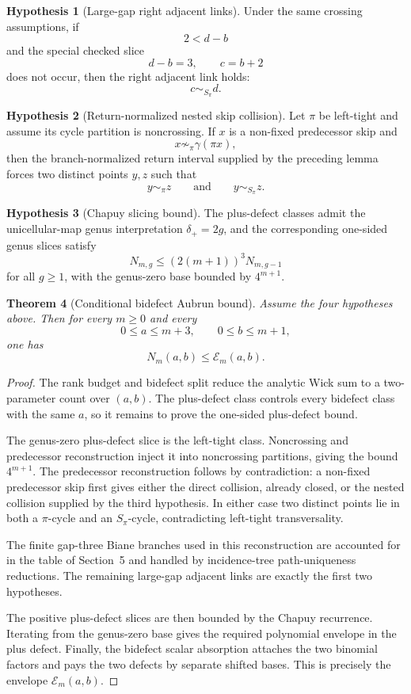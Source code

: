 \documentclass[11pt]{article}
\theoremstyle{plain}
\newtheorem{theorem}{Theorem}[section]
\theoremstyle{definition}
\newtheorem{hypothesis}[theorem]{Hypothesis}
\theoremstyle{remark}
\newcommand{\g}{\gamma}
\newcommand{\p}{\pi}
\newcommand{\defp}{\delta_{+}}
\newcommand{\Env}{\mathcal E}
\begin{document}
\begin{hypothesis}[Large-gap right adjacent links]
Under the same crossing assumptions, if
\[
  2<d-b
\]
and the special checked slice
\[
  d-b=3,\qquad c=b+2
\]
does not occur, then the right adjacent link holds:
\[
  c\sim_{S_\p} d.
\]
\end{hypothesis}

\begin{hypothesis}[Return-normalized nested skip collision]
Let \(\p\) be left-tight and assume its cycle partition is noncrossing.  If
\(x\) is a non-fixed predecessor skip and
\[
  x\not\sim_\p \g(\p x),
\]
then the branch-normalized return interval supplied by the preceding lemma
forces two distinct points \(y,z\) such that
\[
  y\sim_\p z
  \qquad\text{and}\qquad
  y\sim_{S_\p}z.
\]
\end{hypothesis}

\begin{hypothesis}[Chapuy slicing bound]
The plus-defect classes admit the unicellular-map genus interpretation
\(\defp=2g\), and the corresponding one-sided genus slices satisfy
\[
  N_{m,g}\leq (2(m+1))^3N_{m,g-1}
\]
for all \(g\geq 1\), with the genus-zero base bounded by \(4^{m+1}\).
\end{hypothesis}

\begin{theorem}[Conditional bidefect Aubrun bound]
Assume the four hypotheses above.  Then for every \(m\geq 0\) and every
\[
  0\leq a\leq m+3,\qquad 0\leq b\leq m+1,
\]
one has
\[
  N_m(a,b)\leq \Env_m(a,b).
\]
\end{theorem}

\begin{proof}
The rank budget and bidefect split reduce the analytic Wick sum to a
two-parameter count over \((a,b)\).  The plus-defect class controls every
bidefect class with the same \(a\), so it remains to prove the one-sided
plus-defect bound.

The genus-zero plus-defect slice is the left-tight class.  Noncrossing and
predecessor reconstruction inject it into noncrossing partitions, giving the
bound \(4^{m+1}\).  The predecessor reconstruction follows by contradiction:
a non-fixed predecessor skip first gives either the direct collision, already
closed, or the nested collision supplied by the third hypothesis.  In either
case two distinct points lie in both a \(\p\)-cycle and an \(S_\p\)-cycle,
contradicting left-tight transversality.

The finite gap-three Biane branches used in this reconstruction are accounted
for in the table of Section~5 and handled by incidence-tree path-uniqueness
reductions.  The remaining large-gap adjacent links are exactly the first two
hypotheses.

The positive plus-defect slices are then bounded by the Chapuy recurrence.
Iterating from the genus-zero base gives the required polynomial envelope in
the plus defect.  Finally, the bidefect scalar absorption attaches the two
binomial factors and pays the two defects by separate shifted bases.  This is
precisely the envelope \(\Env_m(a,b)\).
\end{proof}
\end{document}
